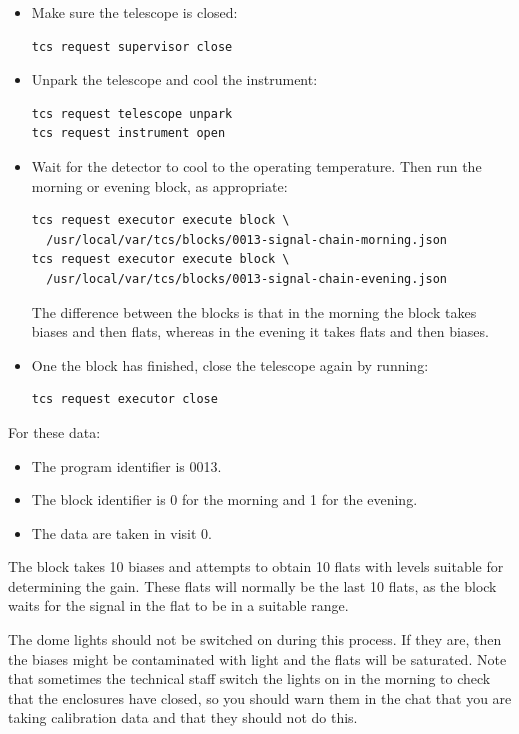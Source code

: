 \begin{itemize}
\item Make sure the telescope is closed:
\begin{verbatim}
tcs request supervisor close
\end{verbatim}
\item Unpark the telescope and cool the instrument:
\begin{verbatim}
tcs request telescope unpark
tcs request instrument open
\end{verbatim}
\item Wait for the detector to cool to the operating temperature. Then run the morning or evening block, as appropriate:
\begin{verbatim}
tcs request executor execute block \
  /usr/local/var/tcs/blocks/0013-signal-chain-morning.json
tcs request executor execute block \
  /usr/local/var/tcs/blocks/0013-signal-chain-evening.json
\end{verbatim}
The difference between the blocks is that in the morning the block takes biases and then flats, whereas in the evening it takes flats and then biases.
\item
One the block has finished, close the telescope again by running:
\begin{verbatim}
tcs request executor close
\end{verbatim}
\end{itemize}

For these data:
\begin{itemize}
\item The program identifier is 0013. 
\item The block identifier is 0 for the morning and 1 for the evening. 
\item The data are taken in visit 0.
\end{itemize}

The block takes 10 biases and attempts to obtain 10 flats with levels suitable for determining the gain. These flats will normally be the last 10 flats, as the block waits for the signal in the flat to be in a suitable range.

The dome lights should not be switched on during this process. If they are, then the biases might be contaminated with light and the flats will be saturated. Note that sometimes the technical staff switch the lights on in the morning to check that the enclosures have closed, so you should warn them in the chat that you are taking calibration data and that they should not do this.
